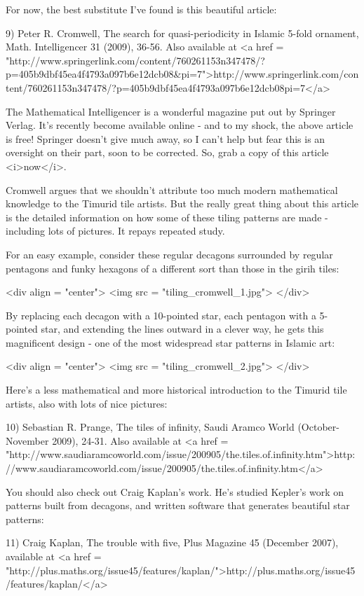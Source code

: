For now, the best substitute I've found is this beautiful article:

9) Peter R. Cromwell, The search for quasi-periodicity in Islamic 
5-fold ornament, Math. Intelligencer 31 (2009), 36-56.
Also available at 
<a href = "http://www.springerlink.com/content/760261153n347478/?p=405b9dbf45ea4f4793a097b6e12dcb08&pi=7">http://www.springerlink.com/content/760261153n347478/?p=405b9dbf45ea4f4793a097b6e12dcb08pi=7</a>

The Mathematical Intelligencer is a wonderful magazine put out by
Springer Verlag.  It's recently become available online - and to my 
shock, the above article is free!  Springer doesn't give much away,
so I can't help but fear this is an oversight on their part, soon to
be corrected.  So, grab a copy of this article <i>now</i>.

Cromwell argues that we shouldn't attribute too much modern
mathematical knowledge to the Timurid tile artists.  But the really
great thing about this article is the detailed information on how some
of these tiling patterns are made - including lots of pictures.  It
repays repeated study.

For an easy example, consider these regular decagons surrounded
by regular pentagons and funky hexagons of a different sort than 
those in the girih tiles:

<div align = "center">
<img src = "tiling_cromwell_1.jpg">
</div>

By replacing each decagon with a 10-pointed star, each pentagon
with a 5-pointed star, and extending the lines outward in a clever
way, he gets this magnificent design - one of the most widespread
star patterns in Islamic art:

<div align = "center">
<img src = "tiling_cromwell_2.jpg">
</div>

Here's a less mathematical and more historical introduction to the
Timurid tile artists, also with lots of nice pictures:

10) Sebastian R. Prange, The tiles of infinity, Saudi Aramco World
(October-November 2009), 24-31.  Also available at
<a href = "http://www.saudiaramcoworld.com/issue/200905/the.tiles.of.infinity.htm">http://www.saudiaramcoworld.com/issue/200905/the.tiles.of.infinity.htm</a>

You should also check out Craig Kaplan's work.  He's studied Kepler's
work on patterns built from decagons, and written software that 
generates beautiful star patterns:

11) Craig Kaplan, The trouble with five, Plus Magazine 45 (December
2007), available at
<a href = "http://plus.maths.org/issue45/features/kaplan/">http://plus.maths.org/issue45/features/kaplan/</a>
 
